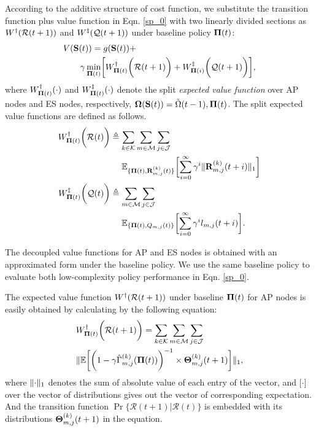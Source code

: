According to the additive structure of cost function, we substitute the transition function plus value function in Eqn. \ref{sp_0} with two linearly divided sections as $W^{\dagger}(\mathcal{R}({t+1}))$ and $W^{\ddagger}(\mathcal{Q}({t+1}))$ under baseline policy $\boldsymbol{\Pi}({t})$:
\begin{align}
    &V(\Stat({t})) = g(\Stat({t})) +
    \nonumber\\
    &~~~~~~\gamma \min_{\BaseLine({t})} \Bracket{ W^{\AP}_{\BaseLine({t})}\Paren{\mathcal{R}({t+1})} + W^{\ES}_{\BaseLine({i})}\Paren{\mathcal{Q}({t+1})} },
\end{align}
where $W^{\dagger}_{\boldsymbol{\Pi}({t})}(\cdot)$ and $W^{\ddagger}_{\boldsymbol{\Pi}({t})}(\cdot)$ denote the split \emph{expected value function} over AP nodes and ES nodes, respectively, $\boldsymbol{\Omega}(\mathbf{S}({t})) = \tilde{\Omega}({t-1}), \boldsymbol{\Pi}({t})$. The split expected value functions are defined as follows.
\begin{align}
    W^{\AP}_{\BaseLine({t})}\Paren{\mathcal{R}({t})}
        &\define \sum_{k\in\apSet}\sum_{m\in\esSet}\sum_{j\in\jSpace}
        \nonumber\\
        &~~~~\mathbb{E}_{\{\BaseLine({t}), \vec{R}^{(k)}_{m,j}({t})\}}\Bracket{
            \sum_{i=0}^{\infty} \gamma^{i} \Inorm{\vec{R}^{(k)}_{m,j}({t+i})}
        }
    \\
    W^{\ES}_{\BaseLine({t})}\Paren{\mathcal{Q}({t})}
        &\define \sum_{m\in\esSet}\sum_{j\in\jSpace}
        \nonumber\\
        &~~~~\mathbb{E}_{\{\BaseLine({t}), Q_{m,j}({t})\}}\Bracket{
            \sum_{i=0}^{\infty} \gamma^{i} l_{m,j}({t+i})
        }.
\end{align}
        
The decoupled value functions for AP and ES nodes is obtained with an approximated form under the baseline policy. We use the same baseline policy to evaluate both low-complexity policy performance in Eqn. \ref{sp_0}.

The expected value function $W^{\dagger}(\mathcal{R}({t+1}))$ under baseline $\boldsymbol{\Pi}({t})$ for AP nodes is easily obtained by calculating by the following equation:
\begin{align}
    &W^{\dagger}_{\boldsymbol{\Pi}({t})}\bigg(\mathcal{R}({t+1})\bigg) = \sum_{k\in\mathcal{K}}\sum_{m\in\mathcal{M}}\sum_{j\in\mathcal{J}}
    \nonumber\\
    & \lVert
        \mathbb{E}\bigg[
            \bigg(
                1 - \gamma \hat{\Gamma}^{(k)}_{m,j}(\boldsymbol{\Pi}({t}))
            \bigg)^{-1} \times \boldsymbol{\Theta}^{(k)}_{m,j}({t+1})
        \bigg]
    \|_1,
    \label{w_ap}
\end{align}
where $\lVert\cdot\|_1$ denotes the sum of absolute value of each entry of the vector, and $\mathbb[\cdot]$ over the vector of distributions gives out the vector of corresponding expectation. And the transition function $\Pr\{ \mathcal{R}({t+1})|\mathcal{R}({t}) \}$ is embedded with its distributions $\boldsymbol{\Theta}^{(k)}_{m,j}({t+1})$ in the equation.

